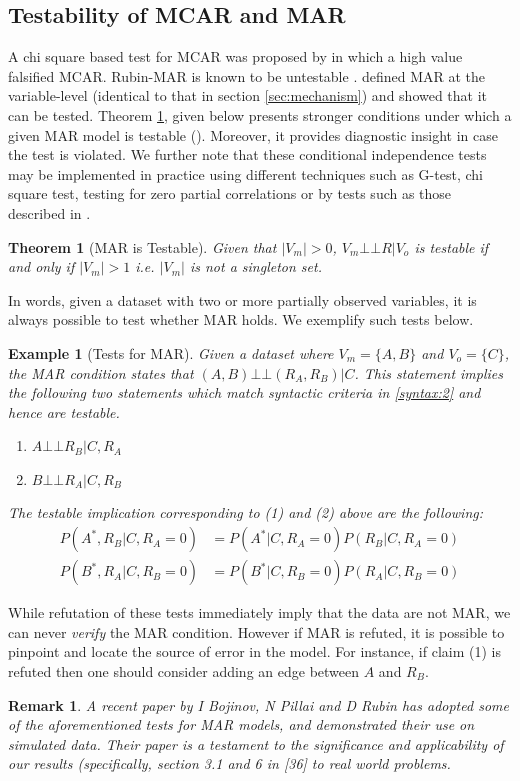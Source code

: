 \documentclass[12pt]{article}
\newcommand{\compos}{\mbox{$\bot\!\!\!\bot$}}
\newtheorem{example}{Example}
\newtheorem{thm}{Theorem}
\newtheorem{remark}{Remark}
\begin{document}
\subsection{Testability of MCAR and MAR}\label{sec:mar}
A chi square based test for MCAR was proposed by \cite{little1988test} in which a high value falsified MCAR\citep{Rubin_missing}. Rubin-MAR  is known to be untestable \citep{impute}. 
\cite{potthoff2006can} defined MAR at the variable-level (identical to that in section \ref{sec:mechanism}) and  showed that it can be tested.
Theorem \ref{thm:mar}, given below presents stronger conditions under which a given MAR model is testable (\cite{mohan2013test}). Moreover, it provides diagnostic insight in case the test is violated. We further note that these conditional independence tests may be implemented in practice using different techniques such as G-test, chi square test, testing for zero partial correlations or by tests such as those described in \cite{szekely2007measuring, gretton2012kernel, sriperumbudur2010hilbert}. 
\begin{thm}[MAR is Testable]\label{thm:mar}
	Given that $|V_m|>0$, $V_m \compos R | V_o$ is testable if and only if $|V_m|>1$ i.e. $|V_m|$ is not a singleton set.
\end{thm}
In words, given  a dataset with two or more partially observed variables, it is always possible to test whether MAR holds.  We exemplify such tests below.

\begin{example}[Tests for MAR] Given a dataset where $V_m=\{A,B\}$ and $V_o=\{C\}$, the MAR condition states that $(A,B) \compos (R_A,R_B)|C$. This statement implies the following two statements which match syntactic criteria in \ref{syntax:2} and hence are testable. 
		\begin{enumerate}
			\item $A \compos R_B|C,R_A$ 
			\item $B \compos R_A|C,R_B$
		\end{enumerate}
			The testable implication corresponding to (1) and (2) above are the following:
			\begin{align*}
			    			 P(A^*,R_B|C,R_A=0)&=P(A^*|C,R_A=0)P(R_B|C,R_A=0) \\
			    			 P(B^*,R_A|C,R_B=0)&=P(B^*|C,R_B=0)P(R_A|C,R_B=0)
			\end{align*}
\end{example} 
While refutation of these tests immediately imply that the data are not MAR,   we can never \textit{verify} the MAR condition. However if MAR  is refuted,  it is possible to pinpoint and locate the source of error in the model.  For instance, if claim (1) is refuted then one should consider adding an edge between $A$ and $R_B$.
\begin{remark} A recent paper by I Bojinov, N Pillai and D Rubin \citep{bojinov2017diagnosing}  has adopted some of the aforementioned
tests for MAR models, and demonstrated their use on simulated data.
Their paper is a testament to the
significance and applicability of our results
(specifically, section 3.1 and 6 in [36] to real world problems.
\end{remark}
\end{document}
